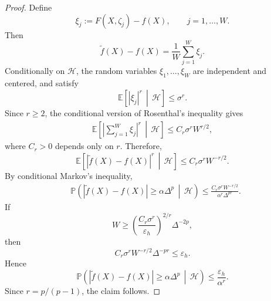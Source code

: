 \documentclass[10pt,a4paper]{amsart}
\begin{document}
\begin{proof}
Define
\[
    \xi_j:=F(X,\zeta_j)-f(X),
    \qquad j=1,\ldots,W.
\]
Then
\[
    \tilde f(X)-f(X)
    =
    \frac{1}{W}\sum_{j=1}^{W}\xi_j.
\]
Conditionally on \(\mathcal H\), the random variables
\(\xi_1,\ldots,\xi_W\) are independent and centered, and satisfy
\[
    \mathbb E\!\left[
        |\xi_j|^r
        \,\middle|\,
        \mathcal H
    \right]
    \le\sigma^r.
\]
Since \(r\ge2\), the conditional version of Rosenthal's inequality gives
\[
\begin{aligned}
    \mathbb E\!\left[
        \left|
        \sum_{j=1}^{W}\xi_j
        \right|^r
        \,\middle|\,
        \mathcal H
    \right]
    \le C_r\sigma^r W^{r/2},
\end{aligned}
\]
where \(C_r>0\) depends only on \(r\).
Therefore,
\[
    \mathbb E\!\left[
        |\tilde f(X)-f(X)|^r
        \,\middle|\,
        \mathcal H
    \right]
    \le
    C_r\sigma^r W^{-r/2}.
\]
By conditional Markov's inequality,
\[
\begin{aligned}
    &\mathbb P\!\left(
        |\tilde f(X)-f(X)|
        \ge
        \alpha\Delta^p
        \,\middle|\,
        \mathcal H
    \right)
    \le
    \frac{
        C_r\sigma^r W^{-r/2}
    }{
        \alpha^r\Delta^{pr}
    }.
\end{aligned}
\]
If
\[
    W
    \ge
    \left(
        \frac{C_r\sigma^r}{\varepsilon_h}
    \right)^{2/r}
    \Delta^{-2p},
\]
then
\[
    C_r\sigma^r W^{-r/2}\Delta^{-pr}
    \le\varepsilon_h.
\]
Hence
\[
    \mathbb P\!\left(
        |\tilde f(X)-f(X)|
        \ge
        \alpha\Delta^p
        \,\middle|\,
        \mathcal H
    \right)
    \le
    \frac{\varepsilon_h}{\alpha^r}.
\]
Since \(r=p/(p-1)\), the claim follows.

\end{proof}
\end{document}
